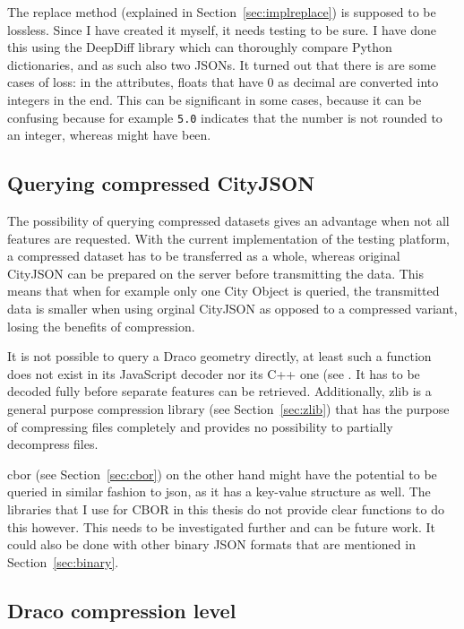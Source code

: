 The replace method (explained in Section~\ref{sec:implreplace}) is supposed to be lossless.
Since I have created it myself, it needs testing to be sure.
I have done this using the DeepDiff library \citep{Dehpour2020} which can thoroughly compare Python dictionaries, and as such also two JSONs.
It turned out that there is are some cases of loss: in the attributes, floats that have 0 as decimal are converted into integers in the end.
This can be significant in some cases, because it can be confusing because for example \texttt{5.0} indicates that the number is not rounded to an integer, whereas  might have been.


\subsection{Querying compressed CityJSON}
\label{querycompressed}

The possibility of querying compressed datasets gives an advantage when not all features are requested.
With the current implementation of the testing platform, a compressed dataset has to be transferred as a whole, whereas original CityJSON can be prepared on the server before transmitting the data.
This means that when for example only one City Object is queried, the transmitted data is smaller when using orginal CityJSON as opposed to a compressed variant, losing the benefits of compression.

It is not possible to query a Draco geometry directly, at least such a function does not exist in its JavaScript decoder nor its C++ one (see \citet{Google2020, Google2020a}.
It has to be decoded fully before separate features can be retrieved.
Additionally, zlib is a general purpose compression library (see Section~\ref{sec:zlib}) that has the purpose of compressing files completely and provides no possibility to partially decompress files.

\ac{cbor} (see Section~\ref{sec:cbor}) on the other hand might have the potential to be queried in similar fashion to \ac{json}, as it has a key-value structure as well.
The libraries that I use for CBOR \citep{Yura2016, Hildebrand2020} in this thesis do not provide clear functions to do this however.
This needs to be investigated further and can be future work.
It could also be done with other binary JSON formats that are mentioned in Section~\ref{sec:binary}.






\subsection{Draco compression level}
\label{dracocompressionlevel}

